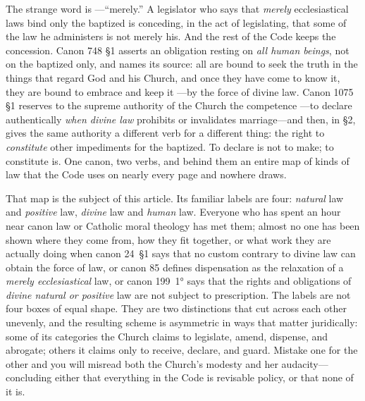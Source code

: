 The strange word is ---``merely.'' A legislator who says that \emph{merely} ecclesiastical laws bind only the baptized is conceding, in the act of legislating, that some of the law he administers is not merely his. And the rest of the Code keeps the concession. Canon 748 §1 asserts an obligation resting on \emph{all human beings}, not on the baptized only, and names its source: all are bound to seek the truth in the things that regard God and his Church, and once they have come to know it, they are bound to embrace and keep it ---by the force of divine law. Canon 1075 §1 reserves to the supreme authority of the Church the competence ---to declare authentically \emph{when divine law} prohibits or invalidates marriage---and then, in §2, gives the same authority a different verb for a different thing: the right to \emph{constitute} other impediments for the baptized. To declare is not to make; to constitute is. One canon, two verbs, and behind them an entire map of kinds of law that the Code uses on nearly every page and nowhere draws.

That map is the subject of this article. Its familiar labels are four: \emph{natural} law and \emph{positive} law, \emph{divine} law and \emph{human} law. Everyone who has spent an hour near canon law or Catholic moral theology has met them; almost no one has been shown where they come from, how they fit together, or what work they are actually doing when canon 24~§1 says that no custom contrary to divine law can obtain the force of law, or canon 85 defines dispensation as the relaxation of a \emph{merely ecclesiastical} law, or canon 199~1° says that the rights and obligations of \emph{divine natural or positive} law are not subject to prescription. The labels are not four boxes of equal shape. They are two distinctions that cut across each other unevenly, and the resulting scheme is asymmetric in ways that matter juridically: some of its categories the Church claims to legislate, amend, dispense, and abrogate; others it claims only to receive, declare, and guard. Mistake one for the other and you will misread both the Church's modesty and her audacity---concluding either that everything in the Code is revisable policy, or that none of it is.

